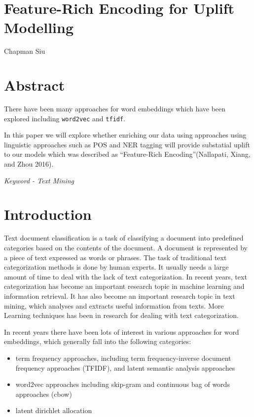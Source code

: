 \section{Feature-Rich Encoding for Uplift
Modelling}\label{feature-rich-encoding-for-uplift-modelling}

Chapman Siu

\section{Abstract}\label{abstract}

There have been many approaches for word embeddings which have been
explored including \texttt{word2vec} and \texttt{tfidf}.

In this paper we will explore whether enriching our data using
approaches using linguistic approaches such as POS and NER tagging will
provide substatial uplift to our models which was described as
``Feature-Rich Encoding''(Nallapati, Xiang, and Zhou 2016).

\emph{Keyword - Text Mining}

\section{Introduction}\label{introduction}

Text document classification is a task of classifying a document into
predefined categories based on the contents of the document. A document
is represented by a piece of text expressed as words or phrases. The
task of traditional text categorization methods is done by human
experts. It usually needs a large amount of time to deal with the lack
of text categorization. In recent years, text categorization has become
an important research topic in machine learning and information
retrieval. It has also become an important research topic in text
mining, which analyses and extracts useful information from texts. More
Learning techniques has been in research for dealing with text
categorization.

In recent years there have been lots of interest in various approaches
for word embeddings, which generally fall into the following categories:

\begin{itemize}
\tightlist
\item
  term frequency approaches, including term frequency-inverse document
  frequency approaches (TFIDF), and latent semantic analysis approaches
\item
  word2vec approaches including skip-gram and continuous bag of words
  approaches (cbow)
\item
  latent dirichlet allocation
\end{itemize}

